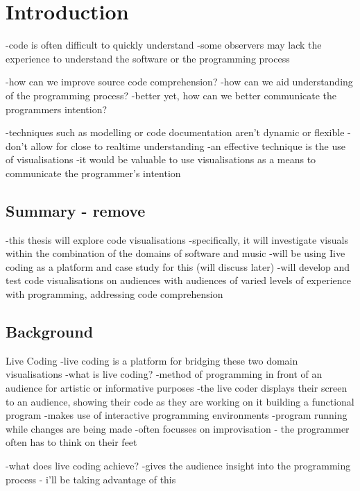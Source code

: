 
\chapter{Introduction}
\label{cha:intro}

-code is often difficult to quickly understand
-some observers may lack the experience to understand the software or the programming process

-how can we improve source code comprehension?
-how can we aid understanding of the programming process?
-better yet, how can we better communicate the programmers intention?

-techniques such as modelling or code documentation aren’t dynamic or flexible
-don’t allow for close to realtime understanding
-an effective technique is the use of visualisations
-it would be valuable to use visualisations as a means to communicate the programmer’s intention


\section{Summary - remove}

-this thesis will explore code visualisations
-specifically, it will investigate visuals within the combination of the domains of software and music
-will be using Iive coding as a platform and case study for this (will discuss later)
-will develop and test code visualisations on audiences with audiences of varied levels of experience with programming, addressing code comprehension

\section{Background}
\label{sec:basis}


Live Coding
-live coding is a platform for bridging these two domain visualisations 
-what is live coding?
-method of programming in front of an audience for artistic or informative purposes
-the live coder displays their screen to an audience, showing their code as they are working on it building a functional program
-makes use of interactive programming environments 
-program running while changes are being made 
-often focusses on improvisation - the programmer often has to think on their feet

-what does live coding achieve?
-gives the audience insight into the programming process - i’ll be taking advantage of this



